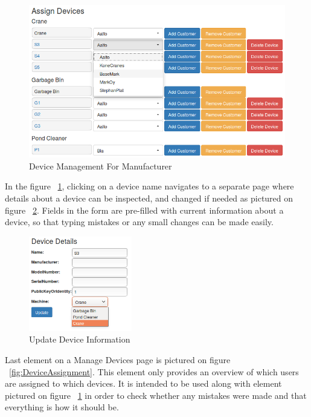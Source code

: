 \begin{figure}[ht]
	\begin{center}
		\includegraphics[width=\textwidth]{images/implementation/ManageDevicesCompany}
		\caption{Device Management For Manufacturer}
		\label{fig:ManageDevicesCompany}
	\end{center}
\end{figure}	

In the figure ~\ref{fig:ManageDevicesCompany}, clicking on a device name navigates to a separate page where details about a device can be inspected, and changed if needed as pictured on figure ~\ref{fig:DeviceDetailsUpdate}. Fields in the form are pre-filled with current information about a device, so that typing mistakes or any small changes can be made easily.

\begin{figure}[ht]
	\begin{center}
		\includegraphics[width=0.4\textwidth]{images/implementation/DeviceDetailsUpdate}
		\caption{Update Device Information}
		\label{fig:DeviceDetailsUpdate}
	\end{center}
\end{figure}

Last element on a Manage Devices page is pictured on figure ~\ref{fig:DeviceAssignment}. This element only provides an overview of which users are assigned to which devices. It is intended to be used along with element pictured on figure ~\ref{fig:ManageDevicesCompany} in order to check whether any mistakes were made and that everything is how it should be.

